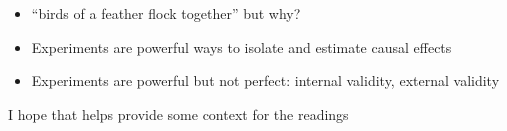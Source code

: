 \documentclass[aspectratio=169]{beamer}
\begin{document}
\begin{frame}

\begin{itemize}
\item ``birds of a feather flock together'' but why? 
\item Experiments are powerful ways to isolate and estimate causal effects
\item Experiments are powerful but not perfect: internal validity, external validity
\end{itemize}

\vfill
I hope that helps provide some context for the readings

\end{frame}
\end{document}
